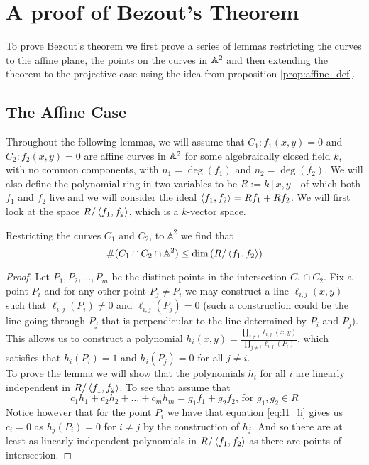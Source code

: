 \section{A proof of Bezout's Theorem}
To prove Bezout's theorem we first prove a series of lemmas restricting the curves to the affine plane, the points on the curves in $\mathbb{A}^2$ and then extending the theorem to the projective case using the idea from proposition \ref{prop:affine_def}.

\subsection{The Affine Case}
\label{sec:affinecase}
Throughout the following lemmas, we will assume that $C_1:f_1(x,y)=0$ and $C_2:f_2(x,y)=0$ are affine curves in $\mathbb{A}^2$ for some algebraically closed field $k$, with no common components, with $n_1=\deg(f_1)$ and $n_2=\deg(f_2)$. We will also define the polynomial ring in two variables to be $R:=k[x,y]$ of which both $f_1$ and $f_2$ live and we will consider the ideal $\left\langle f_1,f_2 \right\rangle=Rf_1+Rf_2$. We will first look at the space $R/\left\langle f_1,f_2 \right\rangle$, which is a $k$-vector space.

\begin{lemma}
\label{lem:1A}
Restricting the curves $C_1$ and $C_2$, to $\mathbb{A}^2$ we find that 
$$\#(C_1\cap C_2\cap\mathbb{A}^2)\leq \dim\left(R/\left\langle f_1,f_2 \right\rangle\right)$$
\end{lemma}
\begin{proof}
Let $P_1, P_2,\dots, P_m$ be the distinct points in the intersection $C_1\cap C_2$. Fix a point $P_i$ and for any other point $P_j\neq P_i$ we may construct a line $\ell_{i,j}(x,y)$ such that $\ell_{i,j}(P_i)\neq 0$ and $\ell_{i,j}(P_j)= 0$ (such a construction could be the line going through $P_j$ that is perpendicular to the line determined by $P_i$ and $P_j$). This allows us to construct a polynomial $h_i(x,y)=\frac{\prod_{j\neq i}\ell_{i,j}(x,y)}{\prod_{j\neq i}\ell_{i,j}(P_i)}$, which satisfies that $h_i(P_i)=1$ and $h_i(P_j)=0$ for all $j\neq i$.\\

To prove the lemma we will show that the polynomials $h_i$ for all $i$ are linearly independent in $R/\left\langle f_1,f_2 \right\rangle$. To see that assume that 
\begin{equation}
\label{eq:l1_li}
c_1h_1+c_2h_2+\dots+c_mh_m=g_1f_1+g_2f_2\text{, for }g_1,g_2\in R
\end{equation}
Notice however that for the point $P_i$ we have that equation \ref{eq:l1_li} gives us $c_i=0$ as $h_j(P_i)=0$ for $i\neq j$ by the construction of $h_j$. And so there are at least as linearly independent polynomials in $R/\left\langle f_1,f_2 \right\rangle$ as there are points of intersection.
\end{proof}

